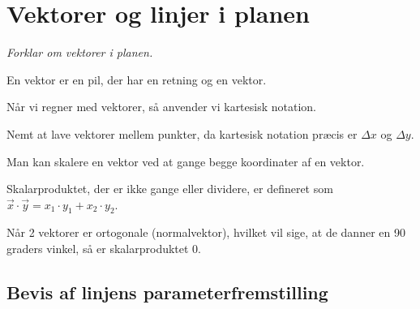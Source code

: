 
\section{Vektorer og linjer i planen}
\emph{Forklar om vektorer i planen.}

En vektor er en pil, der har en retning og en vektor.

Når vi regner med vektorer, så anvender vi kartesisk notation.

Nemt at lave vektorer mellem punkter, da kartesisk notation præcis er $\Delta x$ og $\Delta y$.

Man kan skalere en vektor ved at gange begge koordinater af en vektor.

Skalarproduktet, der er ikke gange eller dividere, er defineret
som $\vec{x}\cdot \vec{y}=x_1 \cdot y_1+x_2 \cdot y_2$.

Når 2 vektorer er ortogonale (normalvektor), hvilket vil sige, at de danner en
90 graders vinkel, så er skalarproduktet 0.

\subsection{Bevis af linjens parameterfremstilling}


